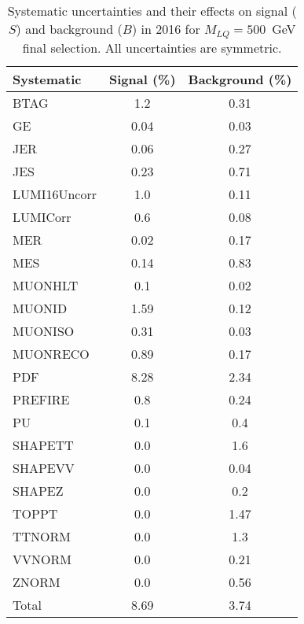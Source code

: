 \begin{table}[htbp]
\begin{center}
\caption{Systematic uncertainties and their effects on signal ($S$) and background ($B$) in 2016 for $M_{LQ}=500$~GeV final selection. All uncertainties are symmetric.}
\begin{tabular}{lcc}
\hline\hline
Systematic & Signal (\%) & Background (\%) \\ \hline 
BTAG & 1.2 & 0.31\\ 
GE & 0.04 & 0.03\\ 
JER & 0.06 & 0.27\\ 
JES & 0.23 & 0.71\\ 
LUMI16Uncorr & 1.0 & 0.11\\ 
LUMICorr & 0.6 & 0.08\\ 
MER & 0.02 & 0.17\\ 
MES & 0.14 & 0.83\\ 
MUONHLT & 0.1 & 0.02\\ 
MUONID & 1.59 & 0.12\\ 
MUONISO & 0.31 & 0.03\\ 
MUONRECO & 0.89 & 0.17\\ 
PDF & 8.28 & 2.34\\ 
PREFIRE & 0.8 & 0.24\\ 
PU & 0.1 & 0.4\\ 
SHAPETT & 0.0 & 1.6\\ 
SHAPEVV & 0.0 & 0.04\\ 
SHAPEZ & 0.0 & 0.2\\ 
TOPPT & 0.0 & 1.47\\ 
TTNORM & 0.0 & 1.3\\ 
VVNORM & 0.0 & 0.21\\ 
ZNORM & 0.0 & 0.56\\ 
Total & 8.69 & 3.74\\ \hline \hline
\end{tabular}
\label{tab:SysUncertainties_uujj_500}
\end{center}
\end{table}

